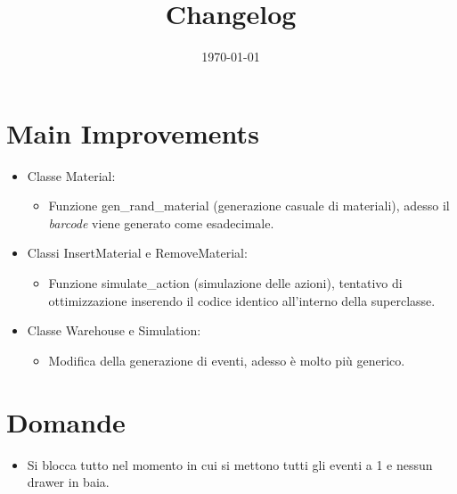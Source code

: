 \documentclass[a4paper]{article}
\begin{document}
	\title{Changelog}
	\date{\today}
	\maketitle
	
	\newpage
	
	\section*{Main Improvements}
	\begin{itemize}[label=]
		\item Classe \textsf{Material}:
		\begin{itemize}
			\item Funzione \textsf{gen\_rand\_material} (generazione casuale di materiali), adesso il \emph{barcode} viene generato come esadecimale.
		\end{itemize}
	
		\item Classi \textsf{InsertMaterial} e \textsf{RemoveMaterial}:
		\begin{itemize}
			\item Funzione \textsf{simulate\_action} (simulazione delle azioni), tentativo di ottimizzazione inserendo il codice identico all'interno della superclasse.
		\end{itemize}
	
		\item Classe \textsf{Warehouse} e \textsf{Simulation}:
		\begin{itemize}
			\item Modifica della generazione di eventi, adesso è molto più generico.
		\end{itemize}
	\end{itemize}
	
	\section*{Domande}
	\begin{itemize}
		\item Si blocca tutto nel momento in cui si mettono tutti gli eventi a 1 e nessun drawer in baia.
	\end{itemize}
\end{document}
